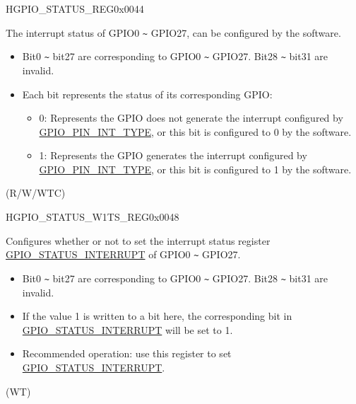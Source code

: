 \begin{register}{H}{GPIO\_STATUS\_REG}{0x0044}\label{regdesc:GPIOSTATUSREG}
%
\regnewline%
\begin{regdesc}\begin{reglist}
\label{fielddesc:GPIOSTATUSINTERRUPT}\item [GPIO\_STATUS\_INTERRUPT] The interrupt status of GPIO0 \verb+~+ GPIO27, can be configured by the software.
\begin{itemize}
    \item Bit0 \verb+~+ bit27 are corresponding to GPIO0 \verb+~+ GPIO27. Bit28 \verb+~+ bit31 are invalid.
    \item Each bit represents the status of its corresponding GPIO:
    \begin{itemize}
        \item 0: Represents the GPIO does not generate the interrupt configured by \hyperref[fielddesc:GPIOPINNINTTYPE]{GPIO\_PIN\_INT\_TYPE}, or this bit is configured to 0 by the software.
        \item 1: Represents the GPIO generates the interrupt configured by \hyperref[fielddesc:GPIOPINNINTTYPE]{GPIO\_PIN\_INT\_TYPE}, or this bit is configured to 1 by the software.
    \end{itemize}
\end{itemize}
(R/W/WTC)
\end{reglist}\end{regdesc}
\end{register}


\begin{register}{H}{GPIO\_STATUS\_W1TS\_REG}{0x0048}\label{regdesc:GPIOSTATUSW1TSREG}
%
\regnewline%
\begin{regdesc}\begin{reglist}
\label{fielddesc:GPIOSTATUSW1TS}\item [GPIO\_STATUS\_W1TS] Configures whether or not to set the interrupt status register \hyperref[fielddesc:GPIOSTATUSINTERRUPT]{GPIO\_STATUS\_INTERRUPT} of GPIO0 \verb+~+ GPIO27.
\begin{itemize}
    \item Bit0 \verb+~+ bit27 are corresponding to GPIO0 \verb+~+ GPIO27. Bit28 \verb+~+ bit31 are invalid.
    \item If the value 1 is written to a bit here, the corresponding bit in \hyperref[fielddesc:GPIOSTATUSINTERRUPT]{GPIO\_STATUS\_INTERRUPT} will be set to 1.
    \item Recommended operation: use this register to set \hyperref[fielddesc:GPIOSTATUSINTERRUPT]{GPIO\_STATUS\_INTERRUPT}.
\end{itemize}
(WT)
\end{reglist}\end{regdesc}
\end{register}


